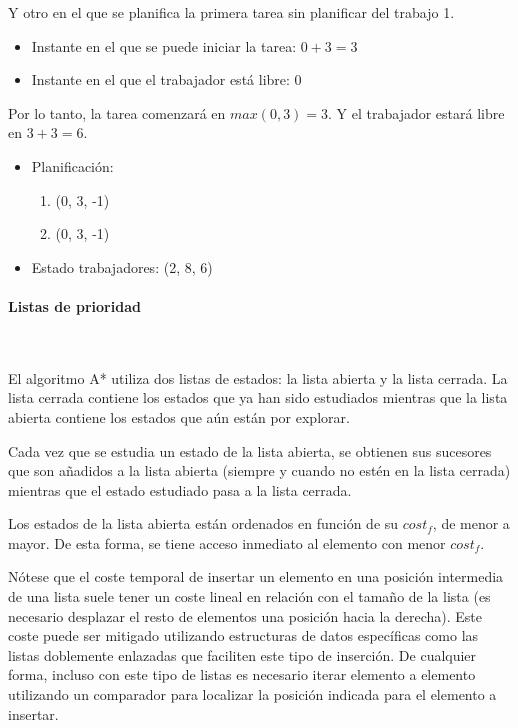 \begin{examplebox}
    Y otro en el que se planifica la primera tarea sin planificar del trabajo 1.
    \begin{itemize}[itemsep=0.25px]
        \item Instante en el que se puede iniciar la tarea: $0 + 3 = 3$
        \item Instante en el que el trabajador está libre: $0$
    \end{itemize}
    Por lo tanto, la tarea comenzará en $max(0, 3) = 3$.
    Y el trabajador estará libre en $3 + 3 = 6$.
    \begin{itemize}[itemsep=0.25px]
        \item Planificación:
        \begin{enumerate}[start=0, itemsep=0.25px]
            \item (0, 3, -1)
            \item (0, 3, -1)
        \end{enumerate}
        \item Estado trabajadores: (2, 8, 6)
    \end{itemize}
\end{examplebox}

\paragraph{Listas de prioridad}~

El algoritmo A* utiliza dos listas de estados: la lista abierta y la lista cerrada.
La lista cerrada contiene los estados que ya han sido estudiados mientras que
la lista abierta contiene los estados que aún están por explorar.

Cada vez que se estudia un estado de la lista abierta,
se obtienen sus sucesores que son añadidos a la lista abierta
(siempre y cuando no estén en la lista cerrada)
mientras que el estado estudiado pasa a la lista cerrada.

Los estados de la lista abierta están ordenados en función de su $cost_f$,
de menor a mayor.
De esta forma, se tiene acceso inmediato al elemento con menor $cost_f$.

Nótese que el coste temporal de insertar un elemento en una posición intermedia
de una lista suele tener un coste lineal en relación con el tamaño de la lista
(es necesario desplazar el resto de elementos una posición hacia la derecha).
Este coste puede ser mitigado utilizando estructuras de datos específicas
como las listas doblemente enlazadas que faciliten este tipo de inserción.
De cualquier forma, incluso con este tipo de listas es necesario
iterar elemento a elemento utilizando un comparador para localizar
la posición indicada para el elemento a insertar.

